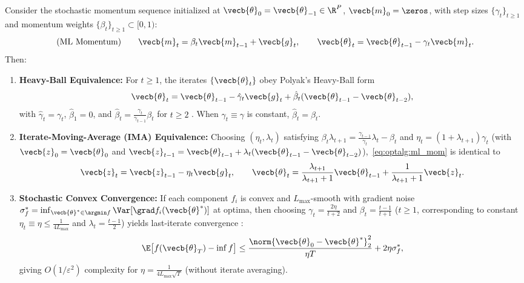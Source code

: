 \documentclass[../../../../master.tex]{subfiles}
\begin{document}
\begin{coremath}
\label{thm:optalg:momentum_equiv}
Consider the stochastic momentum sequence initialized at $\vecb{\theta}_0 = \vecb{\theta}_{-1} \in \R^P$, $\vecb{m}_0 = \zeros$, with step sizes $\{\gamma_t\}_{t \ge 1}$ and momentum weights $\{\beta_t\}_{t \ge 1} \subset [0, 1)$:
\begin{equation}
\label{eq:optalg:ml_mom}
  \text{(ML Momentum)}\qquad \vecb{m}_t = \beta_t \vecb{m}_{t-1} + \vecb{g}_t, \qquad \vecb{\theta}_{t} = \vecb{\theta}_{t-1} - \gamma_t \vecb{m}_t.
\end{equation}
Then:
\begin{enumerate}
  \item \textbf{Heavy-Ball Equivalence:} For $t \ge 1$, the iterates $\{\vecb{\theta}_t\}$ obey Polyak's Heavy-Ball form
  \begin{equation}
  \label{eq:optalg:hb_form}
    \vecb{\theta}_t = \vecb{\theta}_{t-1} - \hat{\gamma}_t \vecb{g}_t + \hat{\beta}_t(\vecb{\theta}_{t-1} - \vecb{\theta}_{t-2}),
  \end{equation}
  with $\hat{\gamma}_t = \gamma_t$, $\hat{\beta}_1 = 0$, and $\hat{\beta}_t = \frac{\gamma_t}{\gamma_{t-1}}\beta_t$ for $t \ge 2$ . When $\gamma_t \equiv \gamma$ is constant, $\hat{\beta}_t = \beta_t$.
  \item \textbf{Iterate-Moving-Average (IMA) Equivalence:} Choosing $(\eta_t, \lambda_t)$ satisfying $\beta_t \lambda_{t+1} = \frac{\gamma_{t-1}}{\gamma_t}\lambda_t - \beta_t$ and $\eta_t = (1 + \lambda_{t+1})\gamma_t$ (with $\vecb{z}_0 = \vecb{\theta}_0$ and $\vecb{z}_{t-1} = \vecb{\theta}_{t-1} + \lambda_t(\vecb{\theta}_{t-1} - \vecb{\theta}_{t-2})$),~\eqref{eq:optalg:ml_mom} is identical to
  \begin{equation}
  \label{eq:optalg:ima_form}
    \vecb{z}_t = \vecb{z}_{t-1} - \eta_t \vecb{g}_t, \qquad \vecb{\theta}_t = \frac{\lambda_{t+1}}{\lambda_{t+1}+1}\vecb{\theta}_{t-1} + \frac{1}{\lambda_{t+1}+1}\vecb{z}_t.
  \end{equation}
  \item \textbf{Stochastic Convex Convergence:} If each component $f_i$ is convex and $L_{\max}$-smooth with gradient noise $\sigma_f^* = \inf_{\vecb{\theta}^*\in\argmin f}\Var[\grad f_i(\vecb{\theta}^*)]$ at optima, then choosing $\gamma_t = \frac{2\eta}{t+2}$ and $\beta_t = \frac{t-1}{t+1}$ ($t \ge 1$, corresponding to constant $\eta_t \equiv \eta \le \frac{1}{4L_{\max}}$ and $\lambda_t = \frac{t-1}{2}$) yields last-iterate convergence :
  \begin{equation}
  \label{eq:optalg:stoch_mom_rate}
    \E\bigl[f(\vecb{\theta}_T) - \inf f\bigr] \le \frac{\norm{\vecb{\theta}_0 - \vecb{\theta}^*}_2^2}{\eta T} + 2\eta\sigma_f^*,
  \end{equation}
  giving $O(1/\varepsilon^2)$ complexity for $\eta = \frac{1}{4L_{\max}\sqrt{T}}$ (without iterate averaging).
\end{enumerate}


\end{coremath}
\end{document}

